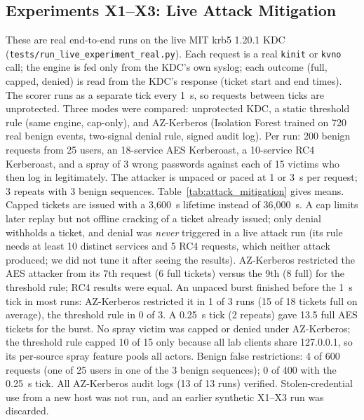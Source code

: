 \documentclass[conference]{IEEEtran}
\begin{document}
\subsection{Experiments X1--X3: Live Attack Mitigation}
These are real end-to-end runs on the live MIT krb5 1.20.1 KDC (\texttt{tests/run\_live\_experiment\_real.py}). Each request is a real \texttt{kinit} or \texttt{kvno} call; the engine is fed only from the KDC's own syslog; each outcome (full, capped, denied) is read from the KDC's response (ticket start and end times). The scorer runs as a separate tick every 1~s, so requests between ticks are unprotected. Three modes were compared: unprotected KDC, a static threshold rule (same engine, cap-only), and AZ-Kerberos (Isolation Forest trained on 720 real benign events, two-signal denial rule, signed audit log). Per run: 200 benign requests from 25 users, an 18-service AES Kerberoast, a 10-service RC4 Kerberoast, and a spray of 3 wrong passwords against each of 15 victims who then log in legitimately. The attacker is unpaced or paced at 1 or 3~s per request; 3 repeats with 3 benign sequences. Table~\ref{tab:attack_mitigation} gives means. Capped tickets are issued with a 3,600~s lifetime instead of 36,000~s. A cap limits later replay but not offline cracking of a ticket already issued; only denial withholds a ticket, and denial was \emph{never} triggered in a live attack run (its rule needs at least 10 distinct services and 5 RC4 requests, which neither attack produced; we did not tune it after seeing the results). AZ-Kerberos restricted the AES attacker from its 7th request (6 full tickets) versus the 9th (8 full) for the threshold rule; RC4 results were equal. An unpaced burst finished before the 1~s tick in most runs: AZ-Kerberos restricted it in 1 of 3 runs (15 of 18 tickets full on average), the threshold rule in 0 of 3. A 0.25~s tick (2 repeats) gave 13.5 full AES tickets for the burst. No spray victim was capped or denied under AZ-Kerberos; the threshold rule capped 10 of 15 only because all lab clients share 127.0.0.1, so its per-source spray feature pools all actors. Benign false restrictions: 4 of 600 requests (one of 25 users in one of the 3 benign sequences); 0 of 400 with the 0.25~s tick. All AZ-Kerberos audit logs (13 of 13 runs) verified. Stolen-credential use from a new host was not run, and an earlier synthetic X1--X3 run was discarded.
\end{document}
